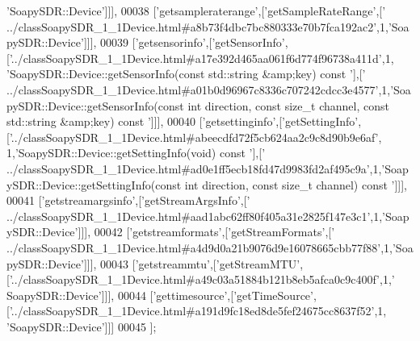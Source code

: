 \begin{DoxyCode}
{      'SoapySDR::Device'}]]],
00038   [\textcolor{stringliteral}{'getsampleraterange'},[\textcolor{stringliteral}{'getSampleRateRange'},[\textcolor{stringliteral}{'
      ../classSoapySDR\_1\_1Device.html#a8b73f4dbc7bc880333e70b7fca192ac2'},1,\textcolor{stringliteral}{'SoapySDR::Device'}]]],
00039   [\textcolor{stringliteral}{'getsensorinfo'},[\textcolor{stringliteral}{'getSensorInfo'},[\textcolor{stringliteral}{'../classSoapySDR\_1\_1Device.html#a17e392d465aa061f6d774f96738a411d'},1,\textcolor{stringliteral}{
      'SoapySDR::Device::getSensorInfo(const std::string &amp;key) const '}],[\textcolor{stringliteral}{'
      ../classSoapySDR\_1\_1Device.html#a01b0d96967c8336c707242cdcc3e4577'},1,\textcolor{stringliteral}{'SoapySDR::Device::getSensorInfo(const int direction, const size\_t channel,
       const std::string &amp;key) const '}]]],
00040   [\textcolor{stringliteral}{'getsettinginfo'},[\textcolor{stringliteral}{'getSettingInfo'},[\textcolor{stringliteral}{'../classSoapySDR\_1\_1Device.html#abeecdfd72f5cb624aa2c9c8d90b9e6af'},
      1,\textcolor{stringliteral}{'SoapySDR::Device::getSettingInfo(void) const '}],[\textcolor{stringliteral}{'
      ../classSoapySDR\_1\_1Device.html#ad0e1ff5ecb18fd47d9983fd2af495c9a'},1,\textcolor{stringliteral}{'SoapySDR::Device::getSettingInfo(const int direction, const size\_t channel) const '}]]],
00041   [\textcolor{stringliteral}{'getstreamargsinfo'},[\textcolor{stringliteral}{'getStreamArgsInfo'},[\textcolor{stringliteral}{'
      ../classSoapySDR\_1\_1Device.html#aad1abc62ff80f405a31e2825f147e3c1'},1,\textcolor{stringliteral}{'SoapySDR::Device'}]]],
00042   [\textcolor{stringliteral}{'getstreamformats'},[\textcolor{stringliteral}{'getStreamFormats'},[\textcolor{stringliteral}{'
      ../classSoapySDR\_1\_1Device.html#a4d9d0a21b9076d9e16078665cbb77f88'},1,\textcolor{stringliteral}{'SoapySDR::Device'}]]],
00043   [\textcolor{stringliteral}{'getstreammtu'},[\textcolor{stringliteral}{'getStreamMTU'},[\textcolor{stringliteral}{'../classSoapySDR\_1\_1Device.html#a49c03a51884b121b8eb5afca0c9c400f'},1,\textcolor{stringliteral}{'
      SoapySDR::Device'}]]],
00044   [\textcolor{stringliteral}{'gettimesource'},[\textcolor{stringliteral}{'getTimeSource'},[\textcolor{stringliteral}{'../classSoapySDR\_1\_1Device.html#a191d9fc18ed8de5fef24675cc8637f52'},1,\textcolor{stringliteral}{
      'SoapySDR::Device'}]]]
00045 ];
\end{DoxyCode}

